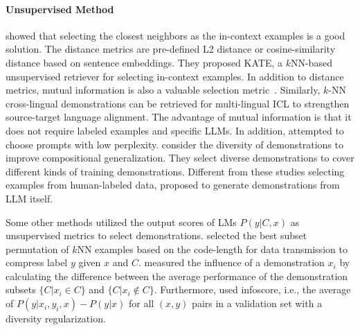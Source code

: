 \paragraph{Unsupervised Method} \citet{liu2022close} showed that selecting the closest neighbors as the in-context examples is a good solution. The distance metrics are pre-defined L2 distance or cosine-similarity distance based on sentence embeddings. %
They proposed KATE, a $k$NN-based unsupervised retriever for selecting in-context examples. In addition to distance metrics, mutual information is also a valuable selection metric~\citep{sorensen2022information}. 
Similarly, $k$-NN cross-lingual demonstrations can be retrieved for multi-lingual ICL \citep{tanwar2023multilingual} to strengthen source-target language alignment.
The advantage of mutual information is that it does not require labeled examples and specific LLMs. 
In addition, \citet{gonen2022demystifying} attempted to choose prompts with low perplexity. 
\citet{levy2022diverse} consider the diversity of demonstrations to improve compositional generalization. They select diverse demonstrations to cover different kinds of training demonstrations. 
Different from these studies selecting examples from human-labeled data, \citet{kim2022self} proposed to generate demonstrations from LLM itself. 

Some other methods utilized the output scores of LMs $P(y|C, x)$ as unsupervised metrics to select demonstrations.
\citet{Wu2022SelfadaptiveIL} selected the best subset permutation of $k$NN examples based on the code-length for data transmission to compress label $y$ given $x$ and $C$.
\citet{nguyen2023influence} measured the influence of a demonstration $x_i$ by calculating the difference between the average performance of the demonstration subsets $\{C|x_i\in C\}$ and $\{C|x_i\notin C\}$. Furthermore, \citet{li2023supporting} used infoscore, i.e., the average of $P(y|x_i,y_i,x) - P(y|x)$ for all $(x,y)$ pairs in a validation set with a diversity regularization.


